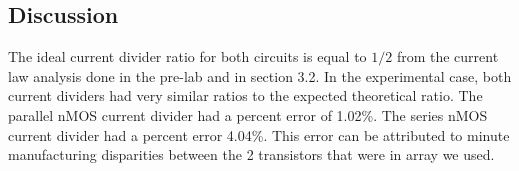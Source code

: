 \documentclass{article}
\begin{document}
\subsection{Discussion}
The ideal current divider ratio for both circuits is equal to $1/2$ from the current law analysis done in the pre-lab and in section 3.2.  In the experimental case, both current dividers had very similar ratios to the expected theoretical ratio.  The parallel nMOS current divider had a percent error of 1.02\%.  The series nMOS current divider had a percent error 4.04\%.  This error can be attributed to minute manufacturing disparities between the 2 transistors that were in array we used.
\end{document}

